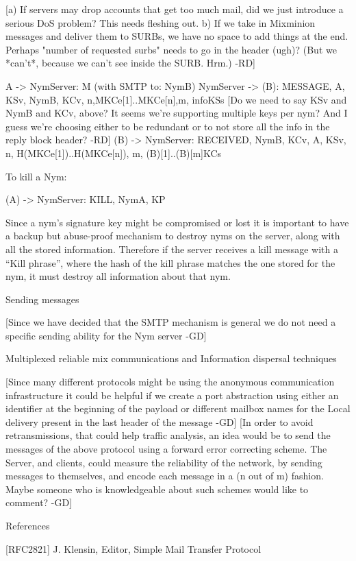 [a) If servers may drop accounts that get too much mail, did we just
 introduce a serious DoS problem? This needs fleshing out.
 b) If we take in Mixminion messages and deliver them to SURBs, we have
 no space to add things at the end. Perhaps "number of requested surbs"
 needs to go in the header (ugh)? (But we *can't*, because we can't see
 inside the SURB. Hrm.) -RD]

A -> NymServer: M (with SMTP to: NymB)
NymServer -> (B): {MESSAGE, A, KSv, NymB, KCv,
                   n,{M}KCe[1]..{M}KCe[n],m, info}KSs
[Do we need to say KSv and NymB and KCv, above? It seems we're supporting
multiple keys per nym? And I guess we're choosing either to be redundant
or to not store all the info in the reply block header? -RD]
(B) -> NymServer: {RECEIVED,  NymB, KCv, A, KSv, n,
                   H({M}KCe[1])..H({M}KCe[n]), m, (B)[1]..(B)[m]}KCs

To kill a Nym:

(A) -> NymServer: {KILL, NymA, KP}

Since a nym's signature key might be compromised or lost it is
important to have a backup but abuse-proof mechanism to destroy nyms
on the server, along with all the stored information. Therefore if the
server receives a kill message with a ``Kill phrase'', where the hash
of the kill phrase matches the one stored for the nym, it must destroy
all information about that nym.

Sending messages

[Since we have decided that the SMTP mechanism is general we do not
  need a specific sending ability for the Nym server -GD]

Multiplexed reliable mix communications and Information dispersal techniques

[Since many different protocols might be using the anonymous
  communication infrastructure it could be helpful if we create a port
  abstraction using either an identifier at the beginning of the
  payload or different mailbox names for the Local delivery present in
  the last header of the message -GD] 
[In order to avoid retransmissions, that could help traffic analysis,
  an idea would be to send the messages of the above protocol using a
  forward error correcting scheme. The Server, and clients, could
  measure the reliability of the network, by sending messages to
  themselves, and encode each message in a (n out of m) fashion. Maybe
  someone who is knowledgeable about such schemes would like to comment? -GD]

References

[RFC2821] J. Klensin, Editor, Simple Mail Transfer Protocol

